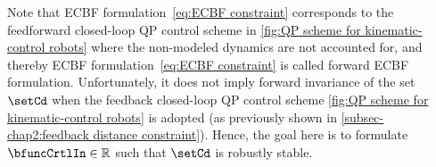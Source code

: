 Note that  ECBF formulation~\eqref{eq:ECBF constraint} corresponds to the feedforward closed-loop QP control scheme in \cref{fig:QP scheme for kinematic-control robots} where the non-modeled dynamics are not accounted for, and thereby ECBF formulation~\eqref{eq:ECBF constraint} is called forward ECBF formulation. Unfortunately, it does not  imply forward invariance of the set $\setCd$ when the feedback closed-loop QP control scheme \cref{fig:QP scheme for kinematic-control robots} is adopted  (as previously shown in \cref{subsec-chap2:feedback distance constraint}). Hence, the goal here is to formulate $\bfuncCrtlIn\in\mathbb{R}$ such that $\setCd$ is robustly stable.
\begin{figure}
	\centering
\end{figure}
